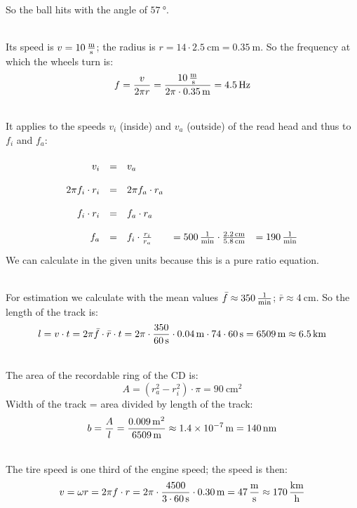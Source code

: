 \documentclass[a4paper]{article}
\begin{document}
	So the ball hits with the angle of $\SI{57}{\degree}$.
	\vspace{0.5 cm}
	
	\\
	Its speed is $v=\SI{10}{\meter\over \second}$; the radius is $r=14\cdot \SI{2.5}{\centi\meter}= \SI{0.35}{\meter}$.
	So the frequency at which the wheels turn is:
	$$ f = {v \over 2\pi r} = {\SI{10}{\meter\over \second} \over 2 \pi \cdot \SI{0.35}{\meter}}=\SI {4.5}{\hertz}$$
	\vspace{0.5 cm}
	
	\\
	It applies to the speeds $v_i$ (inside) and $v_a$ (outside) of the read head and thus to $f_i$ and $f_a$:
	$$
	\renewcommand{\arraystretch}{2}
	\begin{array}{rclll}
		v_i &=& v_a \\
		2\pi f_i \cdot r_i &=& 2\pi f_a \cdot r_a\\
		f_i \cdot r_i &=& f_a \cdot r_a\\
		f_a &=& f_i \cdot {r_i \over r_a} &= \SI{500}{1\over\min} \cdot {\SI{2,2}{\centi\meter} \over \SI{5, 8}{\centi\meter}}&=\SI{190}{1\over\min}
	\end{array}
	$$
	We can calculate in the given units because this is a pure ratio equation.
	\vspace{0.5 cm}
	
	\\
	For estimation we calculate with the mean values $\bar{f}\approx \SI{350}{1\over\min}$; $\bar{r}\approx \SI{4}{\centi\meter}$.
	So the length of the track is:
	$$l = v\cdot t = 2\pi \bar{f} \cdot \bar{r} \cdot t = 2 \pi \cdot {350\over \SI{60}{\second}} \cdot \SI{0.04}{\meter} \cdot 74\cdot \SI{60}{\second} = \SI{6509}{\meter} \approx \SI{6.5}{\kilo\meter}$$
	\vspace{0.5 cm}
	
	\\
	The area of the recordable ring of the CD is:
	$$A=(r_a^2-r_i^2)\cdot \pi =\SI{90}{\centi\meter^2}$$
	Width of the track = area divided by length of the track:
	$$b={A \over l} = {\SI{0.009}{\meter^2} \over \SI{6509}{\meter}} \approx \SI{1.4e-7}{\meter} =\SI{140}{\nano\meter}$$
	\vspace{0.5 cm}
	
	\\
	The tire speed is one third of the engine speed; the speed is then:
	$$v = \omega r = 2\pi f \cdot r = 2\pi \cdot {4500 \over 3 \cdot \SI{60}{\second} }\cdot \SI{0.30}{\meter } =\SI{47}{\meter\over \second}\approx \SI{170}{\kilo\meter\over \hour}$$
	\vspace{0.5 cm}
	
\end{document}
